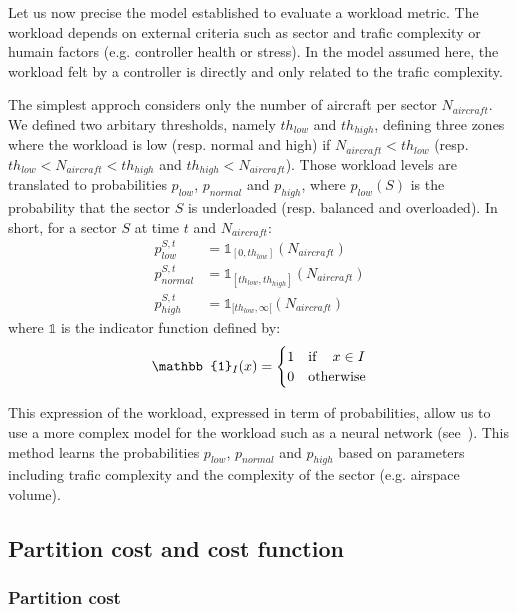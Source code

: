 \documentclass[oneside,twocolumn]{article}
\begin{document}
Let us now precise the model established to evaluate a workload metric. The
workload depends on external criteria such as sector and trafic complexity
or humain factors (e.g. controller health or stress). In the model assumed here,
the workload felt by a controller is directly and only related to the trafic
complexity.

The simplest approch considers only the number of aircraft per sector $N_{aircraft}$. We
defined two arbitary thresholds, namely $th_{low}$ and $th_{high}$, defining
three zones where the workload is low (resp. normal and high) if $N_{aircraft} < th_{low}$
(resp. $th_{low} < N_{aircraft} < th_{high}$ and $th_{high} < N_{aircraft}$).
Those workload levels are translated to probabilities $p_{low}$, $p_{normal}$ and
$p_{high}$, where $p_{low}(S)$ is the probability that the sector $S$ is underloaded
(resp. balanced and overloaded). In short, for a sector $S$ at time $t$ and $N_{aircraft}$:
\begin{equation}
  \begin{aligned}
    p_{low}^{S, t} &= \mathbb{1}_{[0, th_{low}]}(N_{aircraft}) \\
    p_{normal}^{S, t} &= \mathbb{1}_{[th_{low}, th_{high}]}(N_{aircraft})\\
    p_{high}^{S, t} &= \mathbb{1}_{[th_{low}, \infty[}(N_{aircraft})
  \end{aligned}
\end{equation}
where $\mathbb{1}$ is the indicator function defined by:
\begin{equation}
  \mathbb{1}_{I}(x) = 
  \begin{cases}
    1 & \text{if\,} \quad x \in I\\
    0 & \text{otherwise}
  \end{cases}
\end{equation}

This expression of the workload, expressed in term of probabilities, allow us to
use a more complex model for the workload such as a neural network
(see~\cite{gianazza2010forecasting}). This method learns the probabilities $p_{low}$,
$p_{normal}$ and $p_{high}$ based on parameters including trafic complexity and
the complexity of the sector (e.g. airspace volume).

\subsection{Partition cost and cost function}

\subsubsection{Partition cost}
\end{document}
